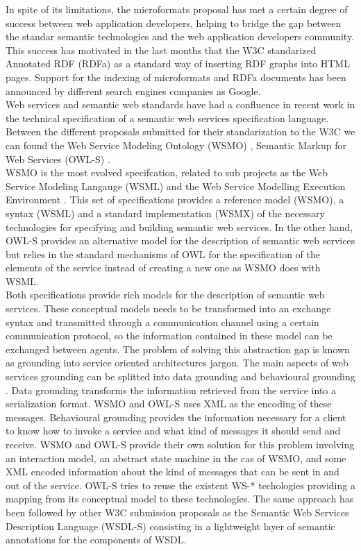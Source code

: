 In spite of its limitations, the microformats proposal has met a certain degree of success between web application
developers, helping to bridge the gap between the standar semantic technologies and the web application developers
community. This success has motivated in the last months that the W3C standarized Annotated RDF (RDFa)  \cite{rdfa} as
a standard way of inserting RDF graphs into HTML pages. Support for the indexing of microformats and RDFa documents has
been announced by different search engines companies as Google.\\

Web services and semantic web standards have had a confluence in recent work in the technical specification of a
semantic web services specification language. Between the different proposals submitted for their standarization to the
W3C we can found the  Web Service Modeling Ontology (WSMO) \cite{wsmo}, Semantic Markup for Web Services (OWL-S) \cite{owls}.\\ 
WSMO is the most evolved specifcation, related to sub projects as the Web Service Modeling Langauge (WSML) \cite{wsml}
and the Web Service Modelling Execution Environment \cite{wsmx}. This set of specifications provides a reference model
(WSMO), a syntax (WSML) and a standard implementation (WSMX) of the necessary technologies for specifying and building
semantic web services. In the other hand, OWL-S provides an alternative model for the description of semantic web
services but relies in the standard mechanisms of OWL for the specification of the elements of the service instead of
creating a new one as WSMO does with WSML. \\

Both specifications provide rich models for the description of semantic web services. These conceptual models needs to
be transformed into an exchange syntax and transmitted through a communication channel using a certain communication
protocol, so the information contained in these model can be exchanged between agents. The problem of solving this
abstraction gap is known as grounding into service oriented architectures jargon. The main aspects of web services
grounding can be splitted into data grounding and behavioural grounding \cite{ISBN:3540345191}. Data grounding
transforms the information retrieved from the service into a serialization format. WSMO and OWL-S uses XML as the
encoding  of these messages. Behavioural grounding provides the information necessary for a client to know how to invoke
a service and what kind of messages it should send and receive. WSMO and OWL-S provide their own solution for this
problem involving an interaction model, an abstract state machine in the cas of WSMO, and some XML encoded information
about the kind of messages that can be sent in and out of the service. OWL-S tries to reuse the existent WS-*
techologies providing a mapping from its conceptual model to these technologies. The same approach has been followed by
other W3C submission proposals as the Semantic Web Services Description Language (WSDL-S) \cite{wsdls} consisting in
a lightweight layer of semantic annotations for the components of WSDL.

